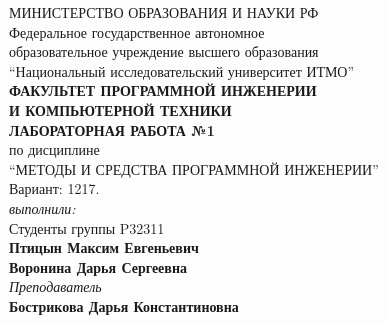 \thispagestyle{empty}
\BgThispage
\begin{center}
	МИНИСТЕРСТВО ОБРАЗОВАНИЯ И НАУКИ РФ\\
	\hfill \break
	Федеральное государственное автономное\\
	образовательное учреждение высшего образования\\
	``Национальный исследовательский университет ИТМО''\\
	\hfill \break
	\textbf{ФАКУЛЬТЕТ ПРОГРАММНОЙ ИНЖЕНЕРИИ \\
	И КОМПЬЮТЕРНОЙ ТЕХНИКИ}\\
	\vspace{2cm}
	\large{\textbf{ЛАБОРАТОРНАЯ РАБОТА №1}}\\
	\hfill \break
	по дисциплине\\
		\large{``МЕТОДЫ И СРЕДСТВА ПРОГРАММНОЙ ИНЖЕНЕРИИ''}\\
	\hfill \break
	Вариант: 1217. \\
	\vspace{3cm}
	\textit{выполнили:}\\
	Студенты группы P32311\\
	\textbf{Птицын Максим Евгеньевич}\\
	\textbf{Воронина Дарья Сергеевна}\\
	\textit{Преподаватель}\\
	\textbf{Бострикова Дарья Константиновна}
\end{center}

\thispagestyle{empty}
\newpage